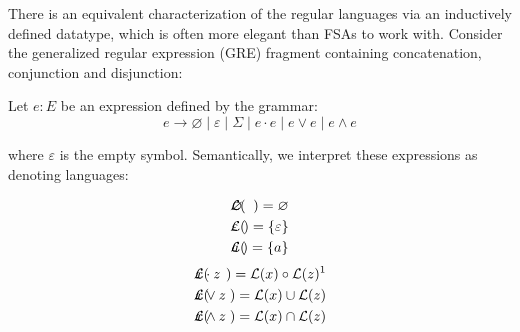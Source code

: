 \documentclass[sigplan,review,acmsmall,nonacm,screen,anonymous]{acmart}\settopmatter{printfolios=false,printccs=false,printacmref=false}
\begin{document}
There is an equivalent characterization of the regular languages via an inductively defined datatype, which is often more elegant than FSAs to work with. Consider the generalized regular expression (GRE) fragment containing concatenation, conjunction and disjunction:

\begin{definition}
  Let \( e: E \) be an expression defined by the grammar:
  \[
    e \rightarrow \varnothing \mid \varepsilon \mid \Sigma \mid e \cdot e \mid e \lor e \mid e \land e
  \]

where $\varepsilon$ is the empty symbol. Semantically, we interpret these expressions as denoting languages:\vspace{-0.8cm}

  \setlength{\columnseprule}{0pt}
  \setlength{\columnsep}{-3cm}
  \begin{multicols}{2}
    \begin{eqnarray*}
      \mathcal{L}(&\hspace{-0.35cm} \varnothing \hspace{-0.35cm}&) = \varnothing \\
      \mathcal{L}(&\hspace{-0.35cm} \varepsilon \hspace{-0.35cm}&) = \{\varepsilon\} \\
      \mathcal{L}(&\hspace{-0.35cm} a           \hspace{-0.35cm}&) = \{a\}
    \end{eqnarray*} \break\vspace{-0.45cm}
    \begin{eqnarray*}
      \mathcal{L}(&\hspace{-0.35cm} x\cdot z \hspace{-0.35cm}&) = \mathcal{L}(x) \circ \mathcal{L}(z)\text{\footnotemark}\\
      \mathcal{L}(&\hspace{-0.35cm} x\vee  z \hspace{-0.35cm}&) = \mathcal{L}(x) \cup  \mathcal{L}(z)\\
      \mathcal{L}(&\hspace{-0.35cm} x\land z \hspace{-0.35cm}&) = \mathcal{L}(x) \cap  \mathcal{L}(z)
    \end{eqnarray*}
  \end{multicols}
\end{definition}\vspace{-0.2cm}
\end{document}
